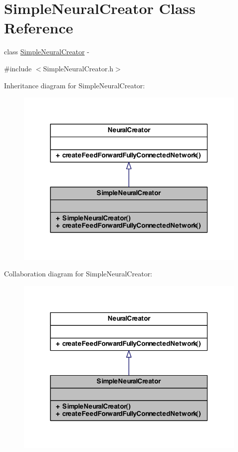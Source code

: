 \hypertarget{class_simple_neural_creator}{
\section{SimpleNeuralCreator Class Reference}
\label{class_simple_neural_creator}
}


class \hyperlink{class_simple_neural_creator}{SimpleNeuralCreator} -\/  




{\ttfamily \#include $<$SimpleNeuralCreator.h$>$}



Inheritance diagram for SimpleNeuralCreator:
\nopagebreak
\begin{figure}[H]
\begin{center}
\leavevmode
\includegraphics[width=316pt]{class_simple_neural_creator__inherit__graph}
\end{center}
\end{figure}


Collaboration diagram for SimpleNeuralCreator:
\nopagebreak
\begin{figure}[H]
\begin{center}
\leavevmode
\includegraphics[width=316pt]{class_simple_neural_creator__coll__graph}
\end{center}
\end{figure}
